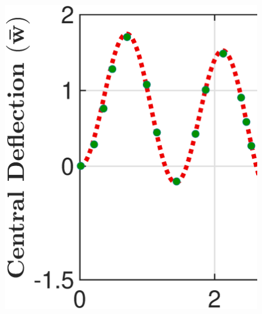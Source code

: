 \documentclass[3p,preprint,12pt]{elsarticle}
\begin{document}
\begin{figure}
\begin{minipage}{0.515\textwidth}
		\includegraphics[width=\linewidth]{Tran_Tri_NPSDT_Transient_h_By_a_1_5.eps}\\
	\end{minipage}\\
	\begin{minipage}{0.515\textwidth}
		\graphicspath{{./All_Images/}}
		\centering

\end{minipage}
\end{figure}
\end{document}
